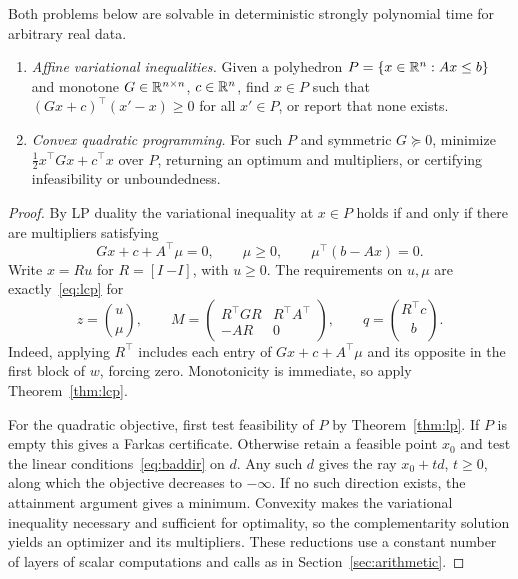\begin{corollary}\label{cor:qp}
Both problems below are solvable in deterministic strongly
polynomial time for arbitrary real data.
\begin{enumerate}
 \item \emph{Affine variational inequalities.} Given a polyhedron \(P=\{x\in\mathbb R^n:Ax\le b\}\)
 and monotone \(G\in\mathbb R^{n\times n}\), \(c\in\mathbb R^n\),
 find \(x\in P\) such that
 \((Gx+c)^\top(x'-x)\ge0\) for all \(x'\in P\), or report
 that none exists.
 \item \emph{Convex quadratic programming.} For such \(P\) and symmetric \(G\succeq0\), minimize
 \(\tfrac12 x^\top Gx+c^\top x\) over \(P\), returning an
 optimum and multipliers, or certifying infeasibility or
 unboundedness.
\end{enumerate}
\end{corollary}


\begin{proof}
By LP duality the variational inequality at \(x\in P\) holds
if and only if there are multipliers satisfying
\[
 Gx+c+A^\top\mu=0,\qquad
 \mu\ge0,\qquad
 \mu^\top(b-Ax)=0.
\]
Write \(x=Ru\) for \(R=[I\ {-I}]\), with \(u\ge0\).
The requirements on \(u,\mu\) are exactly~\eqref{eq:lcp}
for
\[
 z=\binom{u}{\mu},\qquad
 M=\begin{pmatrix}
  R^\top GR & R^\top A^\top\\ -A R & 0
 \end{pmatrix},\qquad
 q=\binom{R^\top c}{b}.
\]
Indeed, applying \(R^\top\) includes each entry of
\(Gx+c+A^\top\mu\) and its opposite in the first block
of \(w\), forcing zero. Monotonicity is
immediate, so apply Theorem~\ref{thm:lcp}.

For the quadratic objective, first test feasibility of \(P\) by
Theorem~\ref{thm:lp}. If \(P\) is empty this gives a Farkas
certificate. Otherwise retain a feasible point \(x_0\) and test the
linear conditions~\eqref{eq:baddir} on \(d\). Any such \(d\) gives
the ray \(x_0+td\), \(t\ge0\), along which the objective decreases
to \(-\infty\). If no such direction exists, the attainment argument
gives a minimum. Convexity makes the variational inequality necessary
and sufficient for optimality, so the complementarity solution yields
an optimizer and its multipliers. These reductions use a constant
number of layers of scalar computations and calls as in
Section~\ref{sec:arithmetic}.
\end{proof}

